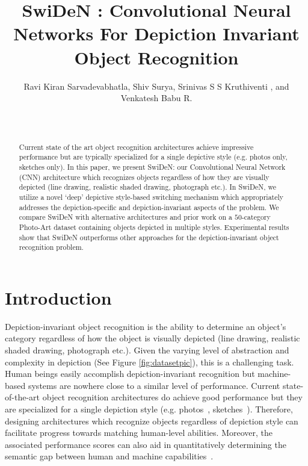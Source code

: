 \documentclass[preprint]{sig-alternate-05-2015}
\begin{document}
\title{SwiDeN : Convolutional Neural Networks For Depiction Invariant Object Recognition}

\author{\alignauthor Ravi Kiran Sarvadevabhatla, Shiv Surya, Srinivas S S Kruthiventi , and\\ Venkatesh Babu R. \\
 \\  \\
}

\maketitle
\begin{abstract}
Current state of the art object  recognition architectures achieve impressive performance but are typically specialized for a single depictive style (e.g. photos only, sketches only). In this paper, we present SwiDeN: our Convolutional Neural Network (CNN) architecture which recognizes objects regardless of how they are visually depicted (line drawing, realistic shaded drawing, photograph etc.). In SwiDeN, we utilize a novel `deep' depictive style-based switching mechanism which appropriately addresses the depiction-specific and depiction-invariant aspects of the problem. We compare SwiDeN with  alternative architectures and prior work on a $50$-category Photo-Art dataset containing objects depicted in multiple styles. Experimental results show that SwiDeN outperforms other approaches for the depiction-invariant object recognition problem. 
\end{abstract}

\section{Introduction}

Depiction-invariant object recognition is the ability to determine an object's category regardless of how the object is visually depicted (line drawing, realistic shaded drawing, photograph etc.). Given the varying level of abstraction and complexity in depiction (See Figure \ref{fig:datasetpic}), this is a challenging task. Human beings easily accomplish depiction-invariant recognition but machine-based systems are nowhere close to a similar level of performance. Current state-of-the-art object recognition architectures do achieve good performance but they are specialized for a single depiction style (e.g. photos~\cite{he2015deep}, sketches~\cite{yang2015deep}). Therefore,  designing architectures which recognize objects regardless of depiction style can facilitate progress towards matching human-level abilities. Moreover, the associated performance scores can also aid in quantitatively determining the semantic gap between human and machine capabilities~\cite{Ullman08032016}. 
\end{document}
